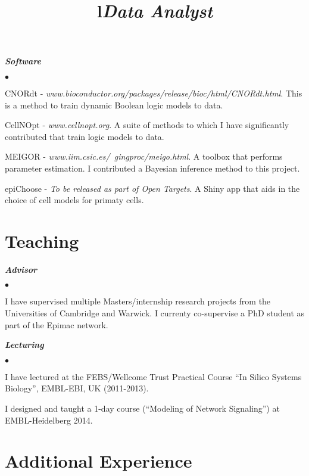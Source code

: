 \documentclass[overlapped, line, 11pt, letterpaper]{res}
\renewenvironment{itemize}{
\begin{list}{$\bullet$}
{\setlength{\itemsep}{0cm}}
}{\end{list}}
\begin{document}
\begin{resume}
\textbf{\emph{Software}}
\begin{itemize}
\item CNORdt - \emph{www.bioconductor.org/packages/release/bioc/html/CNORdt.html}. This is a method to train dynamic Boolean logic models to data.
\item CellNOpt - \emph{www.cellnopt.org}. A suite of methods to which I have significantly contributed that train logic models to data.
\item MEIGOR - \emph{www.iim.csic.es/~gingproc/meigo.html}. A toolbox that performs parameter estimation. I contributed a Bayesian inference method to this project.
\item epiChoose - \emph{To be released as part of Open Targets}. A Shiny app that aids in the choice of cell models for primaty cells.
\end{itemize}

\section{\bf Teaching}
\textbf{\emph{Advisor}}
\begin{itemize}
\item I have supervised multiple Masters/internship research projects from the Universities of Cambridge and Warwick. I currenty co-supervise a PhD student as part of the Epimac network.
\end{itemize}
\textbf{\emph{Lecturing}}
\begin{itemize}
\item I have lectured at the FEBS/Wellcome Trust Practical Course ``In Silico Systems Biology'', EMBL-EBI, UK (2011-2013).
\item I designed and taught a 1-day course (``Modeling of Network Signaling'') at EMBL-Heidelberg 2014.
\end{itemize}

\section{\bf Additional Experience}
\begin{formatb}
\title{l} \\
\\
\body\\
\end{formatb}

\title{\it Data Analyst} 
\begin{position}
\end{position}


\end{resume}
\end{document}
